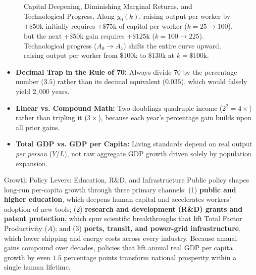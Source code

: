 \documentclass[11pt,letterpaper]{article}
\begin{document}
\begin{figure}[htbp]
\caption{Capital Deepening, Diminishing Marginal Returns, and Technological Progress. Along $y_0(k)$, raising output per worker by $+\$50\text{k}$ initially requires $+\$75\text{k}$ of capital per worker ($k=25 \to 100$), but the next $+\$50\text{k}$ gain requires $+\$125\text{k}$ ($k=100 \to 225$). Technological progress ($A_0 \to A_1$) shifts the entire curve upward, raising output per worker from $\$100\text{k}$ to $\$130\text{k}$ at $k = \$100\text{k}$.}
\label{fig:capital_deepening_productivity}
\end{figure}

\begin{coreprinciple}
\begin{itemize}
  \item \textbf{Decimal Trap in the Rule of 70:} Always divide $70$ by the percentage number ($3.5$) rather than its decimal equivalent ($0.035$), which would falsely yield $2,000\text{ years}$.
  \item \textbf{Linear vs. Compound Math:} Two doublings quadruple income ($2^2 = 4\times$) rather than tripling it ($3\times$), because each year's percentage gain builds upon all prior gains.
  \item \textbf{Total GDP vs. GDP per Capita:} Living standards depend on real output \emph{per person} ($Y/L$), not raw aggregate GDP growth driven solely by population expansion.
\end{itemize}
\end{coreprinciple}

\begin{examplecase}{Growth Policy Levers: Education, R\&D, and Infrastructure}
Public policy shapes long-run per-capita growth through three primary channels: (1) \textbf{public and higher education}, which deepens human capital and accelerates workers' adoption of new tools; (2) \textbf{research and development (R\&D) grants and patent protection}, which spur scientific breakthroughs that lift Total Factor Productivity ($A$); and (3) \textbf{ports, transit, and power-grid infrastructure}, which lower shipping and energy costs across every industry. Because annual gains compound over decades, policies that lift annual real GDP per capita growth by even $1.5$ percentage points transform national prosperity within a single human lifetime.
\end{examplecase}
\end{document}
